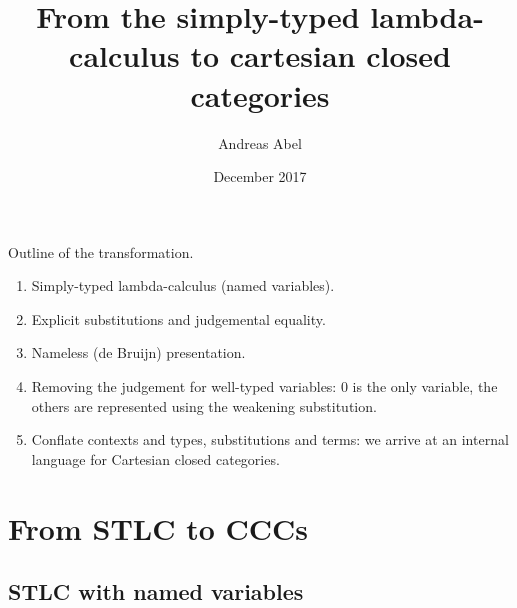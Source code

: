 \documentclass[a4paper,fleqn]{scrartcl}
\title{From the simply-typed lambda-calculus to
  cartesian closed categories}
\author{Andreas Abel}
\date{December 2017}
\begin{document}
\maketitle

Outline of the transformation.
\begin{enumerate}
\item Simply-typed lambda-calculus (named variables).
\item Explicit substitutions and judgemental equality.
\item Nameless (de Bruijn) presentation.
\item Removing the judgement for well-typed variables: $0$ is the only
  variable, the others are represented using the weakening
  substitution.
\item Conflate contexts and types, substitutions and terms: we arrive
  at an internal language for Cartesian closed categories.
\end{enumerate}

\section{From STLC to CCCs}

\subsection{STLC with named variables}
\end{document}
